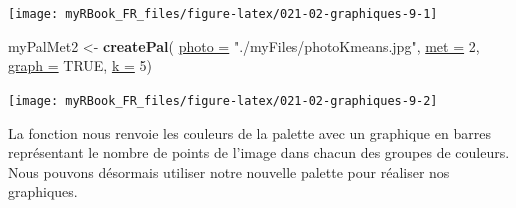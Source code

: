 \documentclass[twoside,symmetric]{book}
\newenvironment{Shaded}{}{}
\newcommand{\DataTypeTok}[1]{\underline{#1}}
\newcommand{\DecValTok}[1]{#1}
\newcommand{\KeywordTok}[1]{\textbf{#1}}
\newcommand{\NormalTok}[1]{#1}
\newcommand{\OtherTok}[1]{#1}
\newcommand{\StringTok}[1]{#1}
\begin{document}
\texttt{[image: myRBook\_FR\_files/figure-latex/021-02-graphiques-9-1]}

\begin{Shaded}
\begin{Highlighting}[]
\NormalTok{myPalMet2 <-}\StringTok{ }\KeywordTok{createPal}\NormalTok{(}
  \DataTypeTok{photo =} \StringTok{"./myFiles/photoKmeans.jpg"}\NormalTok{, }
  \DataTypeTok{met =} \DecValTok{2}\NormalTok{, }
  \DataTypeTok{graph =} \OtherTok{TRUE}\NormalTok{, }
  \DataTypeTok{k =} \DecValTok{5}\NormalTok{)}
\end{Highlighting}
\end{Shaded}

\texttt{[image: myRBook\_FR\_files/figure-latex/021-02-graphiques-9-2]}

La fonction nous renvoie les couleurs de la palette avec un graphique en barres représentant le nombre de points de l'image dans chacun des groupes de couleurs. Nous pouvons désormais utiliser notre nouvelle palette pour réaliser nos graphiques.
\end{document}

